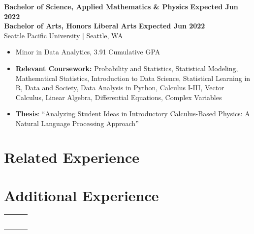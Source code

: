 \documentclass{article}
\begin{document}
    \textbf{Bachelor of Science, Applied Mathematics \& Physics} \hfill \textbf{Expected Jun 2022}\\
    \textbf{Bachelor of Arts, Honors Liberal Arts} \hfill \textbf{Expected Jun 2022}\\
    Seattle Pacific University | Seattle, WA 
    \squish
    \begin{itemize} \setlength\itemsep{-2pt}
        \item Minor in Data Analytics, 3.91 Cumulative GPA
        \item 
        \textbf{Relevant Coursework:} Probability and Statistics, Statistical Modeling, Mathematical Statistics, Introduction to Data Science, Statistical Learning in R, Data and Society, Data Analysis in Python, Calculus I-III, Vector Calculus, Linear Algebra, Differential Equations, Complex Variables
        \item \textbf{Thesis}: ``Analyzing Student Ideas in Introductory Calculus-Based Physics: A Natural Language Processing Approach''
    \end{itemize}


\section{Related Experience}

    
    
    
        


\section{Additional Experience}

    \begin{flushleft}
        \begin{tabularx}{\textwidth}{l l R}
                      \\
                         \\
              \\
                    \\
                             \\
                     \\
        \end{tabularx}
    \end{flushleft}
\end{document}
